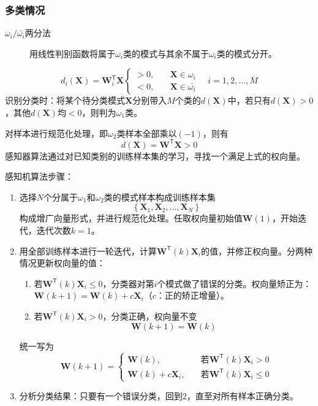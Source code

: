 \subsubsection{多类情况}
\begin{description}
	\item[$\omega_i/\bar{\omega_i}$两分法] 用线性判别函数将属于$\omega_i$类的模式与其余不属于$\omega_i$类的模式分开。
\end{description}
\[ d_i(\mathbf{X})=\mathbf{W}_i^\mathsf{T}\mathbf{X}\begin{cases}
>0,\quad& \mathbf{X}\in\omega_i \\
<0,\quad& \mathbf{X}\in\bar{\omega_i}
\end{cases} \quad i=1,2,\dots,M \]
识别分类时：将某个待分类模式$\mathbf{X}$分别带入$M$个类的$d(\mathbf{X})$中，若只有$d(\mathbf{X})>0$，其他$d(\mathbf{X})$均$<0$，则判为$\omega_1$类。

对样本进行规范化处理，即$\omega_2$类样本全部乘以$(-1)$，则有
\[ d(\mathbf{X})=\mathbf{W}^\mathsf{T}\mathbf{X}>0 \]
感知器算法通过对已知类别的训练样本集的学习，寻找一个满足上式的权向量。

感知机算法步骤：
\begin{enumerate}
	\item 选择$N$个分属于$\omega_1$和$\omega_2$类的模式样本构成训练样本集
	\[ \left\lbrace \mathbf{X}_1,\mathbf{X}_2,\dots,\mathbf{X}_N \right\rbrace \]
	构成增广向量形式，并进行规范化处理。任取权向量初始值$\mathbf{W}(1)$，开始迭代，迭代次数$k=1$。
	\item 用全部训练样本进行一轮迭代，计算$\mathbf{W}^\mathsf{T}(k)\mathbf{X}_i$的值，并修正权向量。分两种情况更新权向量的值：
	\begin{enumerate}
		\item 若$\mathbf{W}^\mathsf{T}(k)\mathbf{X}_i\leq 0$，分类器对第$i$个模式做了错误的分类。权向量矫正为：$\mathbf{W}(k+1)=\mathbf{W}(k)+c\mathbf{X}_i$（$c$：正的矫正增量）。
		\item 若$\mathbf{W}^\mathsf{T}(k)\mathbf{X}_i> 0$，分类正确，权向量不变
		\[ \mathbf{W}(k+1)=\mathbf{W}(k) \]
	\end{enumerate}
	统一写为
	\[ \mathbf{W}(k+1)=\begin{cases}
	\mathbf{W}(k),\quad & \text{若}\mathbf{W}^\mathsf{T}(k)\mathbf{X}_i > 0 \\
	\mathbf{W}(k)+c\mathbf{X}_i, \quad & \text{若}\mathbf{W}^\mathsf{T}(k)\mathbf{X}_i \leq 0
	\end{cases} \]
	\item 分析分类结果：只要有一个错误分类，回到$2$，直至对所有样本正确分类。
\end{enumerate}
